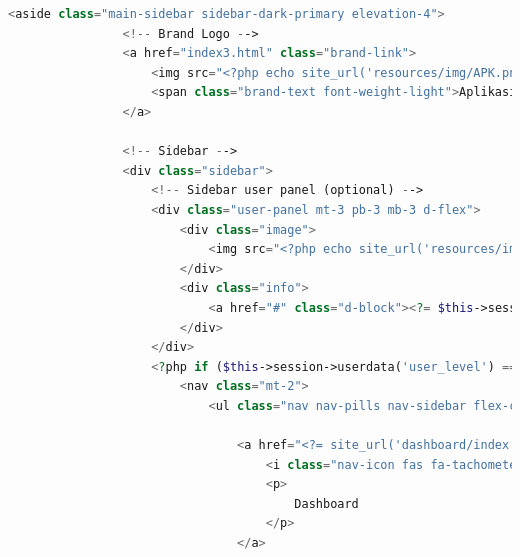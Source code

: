 \begin{lstlisting}[language=PHP]
	        <aside class="main-sidebar sidebar-dark-primary elevation-4">  
	            <!-- Brand Logo -->  
	            <a href="index3.html" class="brand-link">  
	                <img src="<?php echo site_url('resources/img/APK.png'); ?>" alt="AdminLTE Logo" class="brand-image img-circle elevation-3" style="opacity: .8">  
	                <span class="brand-text font-weight-light">Aplikasi Entropy</span>  
	            </a>  
	  
	            <!-- Sidebar -->  
	            <div class="sidebar">  
	                <!-- Sidebar user panel (optional) -->  
	                <div class="user-panel mt-3 pb-3 mb-3 d-flex">  
	                    <div class="image">  
	                        <img src="<?php echo site_url('resources/img/USER.png'); ?>" class="img-circle elevation-2" alt="User Image">  
	                    </div>  
	                    <div class="info">  
	                        <a href="#" class="d-block"><?= $this->session->userdata('user_name'); ?></a>  
	                    </div>  
	                </div>  
	                <?php if ($this->session->userdata('user_level') === 'admin') { ?>  
	                    <nav class="mt-2">  
	                        <ul class="nav nav-pills nav-sidebar flex-column" data-widget="treeview" role="menu" data-accordion="false">  
	  
	                            <a href="<?= site_url('dashboard/index'); ?>" class="nav-link active">  
	                                <i class="nav-icon fas fa-tachometer-alt"></i>  
	                                <p>  
	                                    Dashboard  
	                                </p>  
	                            </a>  
	  

\end{lstlisting}
